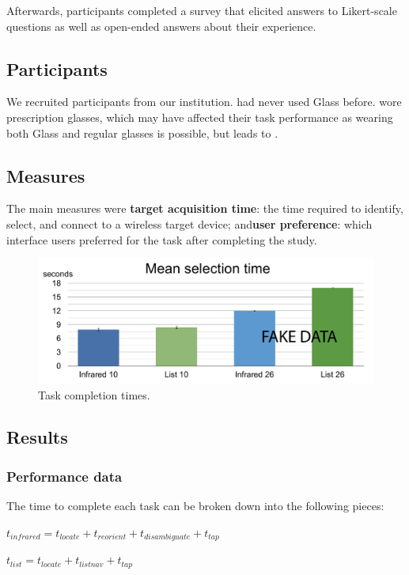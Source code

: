 Afterwards, participants completed a survey that elicited answers to Likert-scale questions as well as open-ended answers about their experience.

\subsection{Participants}
We recruited  participants from our institution.  had never used Glass before.  wore prescription glasses, which may have affected their task performance as wearing both Glass and regular glasses is possible, but leads to .

\subsection{Measures}
The main measures were {\bf target acquisition time}: the time required to identify, select, and connect to a wireless target device; and{\bf user preference}: which interface users preferred for the task after completing the study.


\begin{figure}[t]
\centering
\includegraphics[width=1.0\columnwidth]{figures/selection-times2.pdf}
\caption{Task completion times. }
\label{fig:selection-times}
\end{figure}
\subsection{Results}

\subsubsection{Performance data}
The time to complete each task can be broken down into the following pieces:

$t_{infrared}=t_{locate}+t_{reorient}+t_{disambiguate}+t_{tap}$

$t_{list}=t_{locate}+t_{listnav}+t_{tap}$

